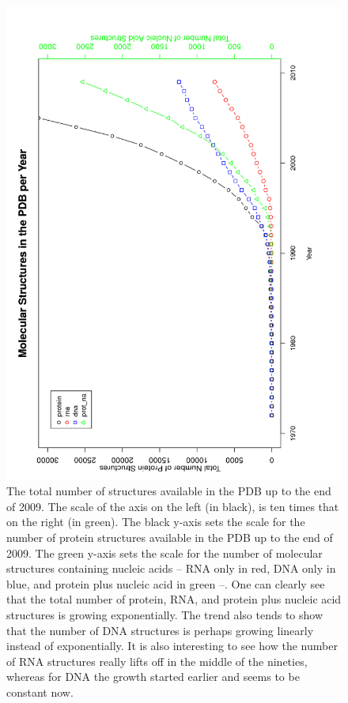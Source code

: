 \begin{figure}
\centering
\includegraphics[angle=0, scale=0.3]{Chapter2/allmolecules_per_year.png}
\caption{The total number of structures available in the PDB up to the
  end of 2009.  The  scale of the axis on the left  (in black), is ten
  times that on the right (in  green). The black y-axis sets the scale
  for the number of protein structures  available in the PDB up to the
  end  of 2009.  The green  y-axis sets  the scale  for the  number of
  molecular structures  containing nucleic acids  -- RNA only  in red,
  DNA only  in blue, and protein  plus nucleic acid in  green --.  One
  can clearly see  that the total number of  protein, RNA, and protein
  plus nucleic  acid structures  is growing exponentially.   The trend
  also  tends to show  that the  number of  DNA structures  is perhaps
  growing linearly  instead of exponentially.  It  is also interesting
  to see  how the  number of  RNA structures really  lifts off  in the
  middle of the  nineties, whereas for DNA the  growth started earlier
  and seems to be constant now.}
\label{fig:allpolypdb}
\end{figure}

